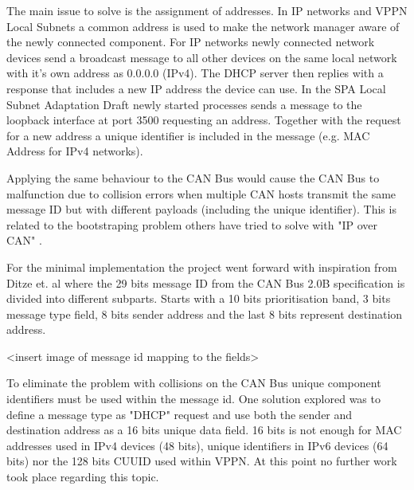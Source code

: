 The main issue to solve is the assignment of addresses. In IP networks and VPPN Local
Subnets a common address is used to make the network manager aware of the newly
connected component. For IP networks newly connected network devices send a
broadcast message to all other devices on the same local network with it's own
address as 0.0.0.0 (IPv4). The DHCP server then replies with a response that
includes a new IP address the device can use. In the SPA Local Subnet
Adaptation Draft newly started processes sends a message to the loopback
interface at port 3500 requesting an address. Together with the request for a
new address a unique identifier is included in the message (e.g. MAC Address
for IPv4 networks).

Applying the same behaviour to the CAN Bus would cause the CAN Bus to
malfunction due to collision errors when multiple CAN hosts transmit the same
message ID but with different payloads (including the unique identifier).
This is related to the bootstraping problem others have tried to solve with
"IP over CAN" \cite{web:draft-ip_over_can, web:porting_ip_can}.

For the minimal implementation the project went forward with inspiration from
Ditze et. al \cite{web:porting_ip_can} where the 29 bits message ID from the
CAN Bus 2.0B specification is divided into different subparts. Starts with a 10
bits prioritisation band, 3 bits message type field, 8 bits sender address and
the last 8 bits represent destination address.

<insert image of message id mapping to the fields>

To eliminate the problem with collisions on the CAN Bus unique component
identifiers must be used within the message id. One solution explored was to
define a message type as "DHCP" request and use both the sender and destination
address as a 16 bits unique data field. 16 bits is not enough for MAC addresses
used in IPv4 devices (48 bits), unique identifiers in IPv6 devices (64 bits)
nor the 128 bits CUUID used within VPPN. At this point no further work took
place regarding this topic.

